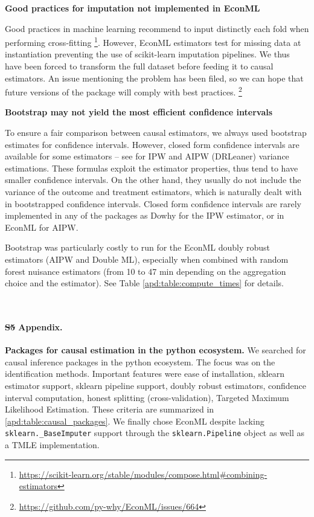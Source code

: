 \documentclass[10pt,letterpaper]{article}
\providecommand{\DIFaddtex}[1]{{\protect\color{blue}\uwave{#1}}} %
\providecommand{\DIFdeltex}[1]{{\protect\color{red}\sout{#1}}}                      %
\providecommand{\DIFaddbegin}{} %
\providecommand{\DIFaddend}{} %
\providecommand{\DIFdelbegin}{} %
\providecommand{\DIFdelend}{} %
\providecommand{\DIFadd}[1]{\texorpdfstring{\DIFaddtex{#1}}{#1}} %
\providecommand{\DIFdel}[1]{\texorpdfstring{\DIFdeltex{#1}}{}} %
\newcommand{\DIFscaledelfig}{0.5}
\newlength{\DIFdelgraphicswidth} %
\newlength{\DIFdelgraphicsheight} %
\newcommand{\DIFaddincludegraphics}[2][]{{\color{blue}\fbox{\DIFOincludegraphics[#1]{#2}}}} %
\newcommand{\DIFdelincludegraphics}[2][]{%
\sbox{\DIFdelgraphicsbox}{\DIFOincludegraphics[#1]{#2}}%
\settoboxwidth{\DIFdelgraphicswidth}{\DIFdelgraphicsbox} %
\settoboxtotalheight{\DIFdelgraphicsheight}{\DIFdelgraphicsbox} %
\scalebox{\DIFscaledelfig}{%
\parbox[b]{\DIFdelgraphicswidth}{\usebox{\DIFdelgraphicsbox}\\[-\baselineskip] \rule{\DIFdelgraphicswidth}{0em}}\llap{\resizebox{\DIFdelgraphicswidth}{\DIFdelgraphicsheight}{%
\setlength{\unitlength}{\DIFdelgraphicswidth}%
\begin{picture}(1,1)%
\thicklines\linethickness{2pt} %
{\color[rgb]{1,0,0}\put(0,0){\framebox(1,1){}}}%
{\color[rgb]{1,0,0}\put(0,0){\line( 1,1){1}}}%
{\color[rgb]{1,0,0}\put(0,1){\line(1,-1){1}}}%
\end{picture}%
}\hspace*{3pt}}} %
} %
\DeclareRobustCommand{\DIFaddbegin}{\DIFOaddbegin \let\includegraphics\DIFaddincludegraphics} %
\DeclareRobustCommand{\DIFaddend}{\DIFOaddend \let\includegraphics\DIFOincludegraphics} %
\DeclareRobustCommand{\DIFdelbegin}{\DIFOdelbegin \let\includegraphics\DIFdelincludegraphics} %
\DeclareRobustCommand{\DIFdelend}{\DIFOaddend \let\includegraphics\DIFOincludegraphics} %
\begin{document}
\textbf{Good practices for imputation not implemented in EconML}

Good practices in machine learning recommend to input distinctly each fold
when performing cross-fitting
\footnote{\url{https://scikit-learn.org/stable/modules/compose.html\#combining-estimators}}.
However, EconML estimators test for missing data at instantiation
preventing the use of scikit-learn imputation pipelines. We thus have been
forced to transform the full dataset before feeding it to causal estimators.
An issue mentioning the problem has been filed, so we can hope that future
versions of the package will comply with best practices. \footnote{\url{https://github.com/py-why/EconML/issues/664}}

\textbf{Bootstrap may not yield the most efficient confidence intervals}

To ensure a fair comparison between causal estimators, we always used
bootstrap estimates for confidence intervals. However, closed form
confidence intervals are available for some estimators -- see \cite{wager2020stats}
for IPW and AIPW (DRLeaner) variance estimations. These formulas exploit the
estimator properties, thus tend to have smaller confidence intervals. On the
other hand, they usually do not include the variance of the outcome and
treatment estimators, which is naturally dealt with in bootstrapped confidence
intervals. Closed form confidence intervals are rarely implemented in any of the
packages as Dowhy for the IPW estimator, or in EconML for AIPW.

Bootstrap was particularly costly to run for the EconML doubly robust
estimators (AIPW and Double ML), especially when combined with random forest nuisance
estimators (from 10 to 47 min depending on the aggregation choice and the
estimator). See Table \ref{apd:table:compute_times} for details.

\begin{table}[]
  \centering\small
  
  \\
  \caption{Compute times for the different estimation methods with 50 bootstrap replicates.}\label{apd:table:compute_times}
\end{table}
\clearpage


\paragraph*{\DIFdelbegin \DIFdel{S5 }\DIFdelend \DIFaddbegin \DIFadd{S4 }\DIFaddend Appendix.}
\label{apd:packages}
{\bf Packages for causal estimation in the python ecosystem.}
We searched for causal inference packages in the python ecosystem. The focus
was on the identification methods. Important features were ease of
installation, sklearn estimator support, sklearn pipeline support, doubly
robust estimators, confidence interval computation, honest splitting
(cross-validation), Targeted Maximum Likelihood Estimation. These criteria are
summarized in \ref{apd:table:causal_packages}. We finally chose EconML despite
lacking \texttt{sklearn.\_BaseImputer} support through the
\texttt{sklearn.Pipeline} object as well as a TMLE implementation.
\end{document}
